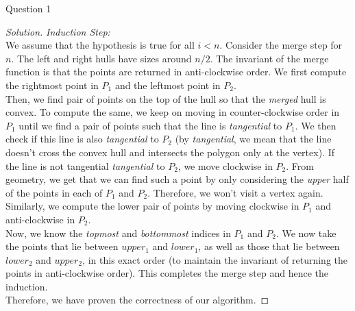 \begin{solution}{Question 1}
\begin{proof}[Solution]
        \textit{Induction Step:}\\
        We assume that the hypothesis is true for all $i < n$. Consider the merge step for $n$. The left and right hulls have sizes around $n/2$. The invariant of the merge function is that the points are returned in anti-clockwise order. We first compute the rightmost point in $P_1$ and the leftmost point in $P_2$.\\
        Then, we find pair of points on the top of the hull so that the \textit{merged} hull is convex. To compute the same, we keep on moving in counter-clockwise order in $P_1$ until we find a pair of points such that the line is \textit{tangential} to $P_1$. We then check if this line is also \textit{tangential} to $P_2$ (by \textit{tangential}, we mean that the line doesn't cross the convex hull and intersects the polygon only at the vertex). If the line is not tangential \textit{tangential} to $P_2$, we move clockwise in $P_2$. From geometry, we get that we can find such a point by only considering the \textit{upper} half of the points in each of $P_1$ and $P_2$. Therefore, we won't visit a vertex again.\\
        Similarly, we compute the lower pair of points by moving clockwise in $P_1$ and anti-clockwise in $P_2$.\\
        Now, we know the \textit{topmost} and \textit{bottommost} indices in $P_1$ and $P_2$. We now take the points that lie between $upper_1$ and $lower_1$, as well as those that lie between $lower_2$ and $upper_2$, in this exact order (to maintain the invariant of returning the points in anti-clockwise order). This completes the merge step and hence the induction.\\
        Therefore, we have proven the correctness of our algorithm.
    
    \end{proof}
\end{solution}

